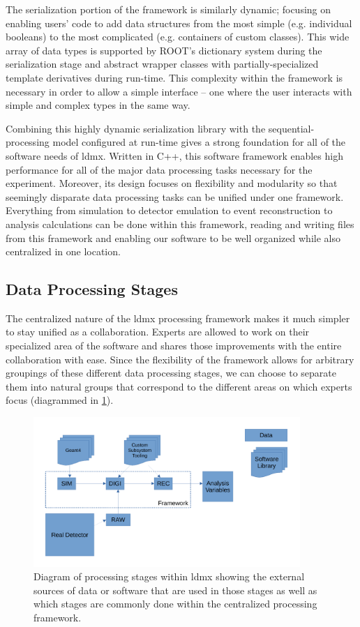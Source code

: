 The serialization portion of the framework is similarly dynamic; focusing on enabling users' code to add data structures from the most simple (e.g. individual booleans) to the most complicated (e.g. containers of custom classes). This wide array of data types is supported by ROOT's dictionary system during the serialization stage and abstract wrapper classes with partially-specialized template derivatives during run-time. This complexity within the framework is necessary in order to allow a simple interface -- one where the user interacts with simple and complex types in the same way.

Combining this highly dynamic serialization library with the sequential-processing model configured at run-time gives a strong foundation for all of the software needs of \ac{ldmx}. Written in C++, this software framework enables high performance for all of the major data processing tasks necessary for the experiment. Moreover, its design focuses on flexibility and modularity so that seemingly disparate data processing tasks can be unified under one framework. Everything from simulation to detector emulation to event reconstruction to analysis calculations can be done within this framework, reading and writing files from this framework and enabling our software to be well organized while also centralized in one location.

\subsection{Data Processing Stages}
The centralized nature of the \ac{ldmx} processing framework makes it much simpler to stay unified as a collaboration. Experts are allowed to work on their specialized area of the software and shares those improvements with the entire collaboration with ease. Since the flexibility of the framework allows for arbitrary groupings of these different data processing stages, we can choose to separate them into natural groups that correspond to the different areas on which experts focus (diagrammed in \cref{fig:ldmx:sim:data-stages}).

\begin{figure}
	\centering
	\includegraphics[width=0.9\textwidth]{figures/ldmx/simulation/data-flow.pdf}
	\caption{Diagram of processing stages within \ac{ldmx} showing the external sources of data or software that are used in those stages as well as which stages are commonly done within the centralized processing framework.}
	\label{fig:ldmx:sim:data-stages}
\end{figure}

